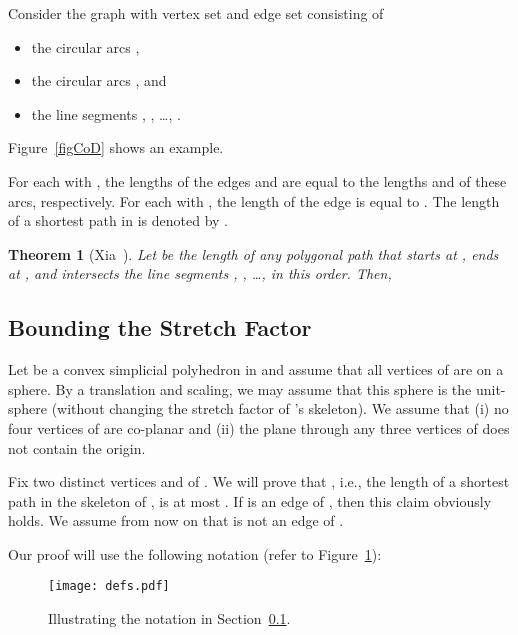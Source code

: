 \documentclass[12pt]{article}
\newtheorem{theorem}{Theorem}
\begin{document}
Consider the graph  with vertex set 
 and edge set 
consisting of 
\begin{itemize}
\item the circular arcs , 
\item the circular arcs , and 
\item the line segments , , \ldots , .
\end{itemize} 
Figure~\ref{figCoD} shows an example. 
 
For each  with , the lengths of the edges  and 
 are equal to the lengths  and  of these arcs,
respectively. For each  with , the length of the edge 
 is equal to . The length of a shortest path in 
 is denoted by . 

\begin{theorem}[Xia~\cite{x-sfdtl-13}]   \label{thmxia} 
Let  be the length of any polygonal path that starts at , ends at 
, and intersects the line segments 
, , \ldots ,  in this order. Then, 
  
\end{theorem} 


\subsection{Bounding the Stretch Factor}  \label{subsecSFCP} 
Let  be a convex simplicial polyhedron in  and assume that 
all vertices of  are on a sphere. By a translation and scaling, we 
may assume that this sphere is the unit-sphere  (without changing 
the stretch factor of 's skeleton). We assume that 
(i) no four vertices of  are co-planar and (ii) the plane through 
any three vertices of  does not contain the origin. 

Fix two distinct vertices  and  of . We will prove that 
, i.e., the length of a shortest path in the skeleton 
 of , is at most . If  is 
an edge of , then this claim obviously holds. We assume from 
now on that  is not an edge of . 

Our proof will use the following notation (refer to 
Figure~\ref{figdefs}): 

\begin{figure}
\begin{center}
\texttt{[image: defs.pdf]}
\end{center}
\caption{Illustrating the notation in Section~\ref{subsecSFCP}.}  
\label{figdefs}
\end{figure}
\end{document}
